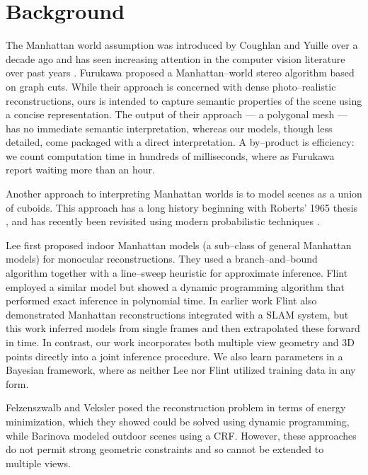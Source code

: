 \section{Background}
The Manhattan world assumption was introduced by Coughlan and
Yuille\cite{Coughlan99} over a decade ago and has seen increasing
attention in the computer vision literature over past years
\cite{Coughlan99,Zhang02,Lee09,Furukawa09,FlintECCV10}. Furukawa
\etal \cite{Furukawa09} proposed a Manhattan--world stereo algorithm
based on graph cuts. While their approach is concerned with dense
photo--realistic reconstructions, ours is intended to capture semantic
properties of the scene using a concise representation. The output of
their approach --- a polygonal mesh --- has no immediate semantic
interpretation, whereas our models, though less detailed, come
packaged with a direct interpretation. A by--product is efficiency: we
count computation time in hundreds of milliseconds, where as
Furukawa \etal report waiting more than an hour.

Another approach to interpreting Manhattan worlds is to model scenes
as a union of cuboids. This approach has a long history beginning with
Roberts' 1965 thesis \cite{Roberts65}, and has recently been revisited
using modern probabilistic techniques \cite{Gupta10,Vanegas10}.

Lee \etal \cite{Lee09} first proposed indoor Manhattan models (a
sub--class of general Manhattan models) for monocular
reconstructions. They used a branch--and--bound algorithm together
with a line--sweep heuristic for approximate inference. Flint \etal
\cite{FlintECCV10} employed a similar model but showed a
dynamic programming algorithm that performed exact inference in
polynomial time. In earlier work \cite{FlintCVPR10} Flint \etal also
demonstrated Manhattan reconstructions integrated with a SLAM system,
but this work inferred models from single frames and then extrapolated
these forward in time. In contrast, our work incorporates both
multiple view geometry and 3D points directly into a joint inference
procedure. We also learn parameters in a Bayesian framework, where as
neither Lee nor Flint utilized training data in any form.

Felzenszwalb and Veksler \cite{Felzenszwalb10} posed the
reconstruction problem in terms of energy minimization, which they
showed could be solved using dynamic programming, while Barinova \etal
\cite{Barinova08} modeled outdoor scenes using a CRF. However, these
approaches do not permit strong geometric constraints and so cannot be
extended to multiple views.

